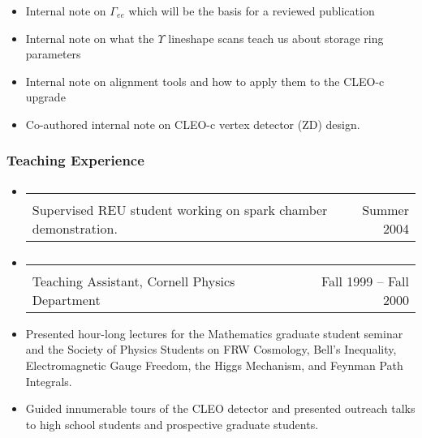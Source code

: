 \documentclass[12pt]{article}
\begin{document}
\begin{itemize}
  \item Internal note on $\Gamma_{ee}$ which will be the basis for
    a reviewed publication

  \item Internal note on what the $\Upsilon$ lineshape scans teach us
    about storage ring parameters

  \item Internal note on alignment tools and how to apply them to the
    CLEO-c upgrade

  \item Co-authored internal note on CLEO-c vertex detector (ZD) design.

\end{itemize}

\subsubsection*{Teaching Experience}

\begin{itemize}

  \item \hspace{-0.3 cm} \begin{tabular}{l r} \mbox{\hspace{0.65\linewidth}} & \mbox{\hspace{0.177\linewidth}} \vspace{-0.4 cm} \\
Supervised REU student working on spark chamber demonstration. & Summer 2004 \end{tabular}

  \item \hspace{-0.3 cm} \begin{tabular}{l r} \mbox{\hspace{0.65\linewidth}} & \mbox{\hspace{0.315\linewidth}} \vspace{-0.4 cm} \\
Teaching Assistant, Cornell Physics Department & Fall 1999 -- Fall 2000 \end{tabular}

  \vspace{0.15 cm}

  \item Presented hour-long lectures for the Mathematics graduate
  student seminar and the Society of Physics Students on FRW
  Cosmology, Bell's Inequality, Electromagnetic Gauge Freedom, the
  Higgs Mechanism, and Feynman Path Integrals.

  \item Guided innumerable tours of the CLEO detector and presented
  outreach talks to high school students and prospective graduate
  students.

\end{itemize}
\end{document}
